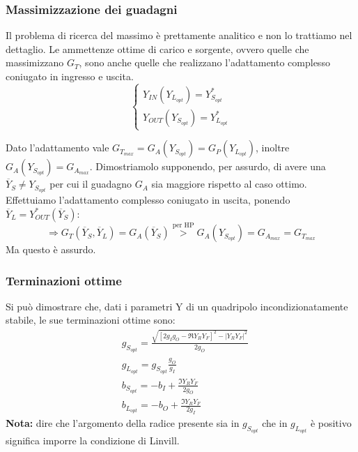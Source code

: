 \subsubsection{Massimizzazione dei guadagni}
Il problema di ricerca del massimo è prettamente analitico e non lo trattiamo nel dettaglio.	Le ammettenze ottime di carico e sorgente, ovvero quelle che massimizzano $G_T$, sono anche quelle	che realizzano l'adattamento complesso coniugato in ingresso e uscita.
\[
\begin{cases}
Y_{IN} (Y_{L_{opt}}) = Y_{S_{opt}}^*\\
Y_{OUT} (Y_{S_{opt}}) = Y_{L_{opt}}^*
\end{cases}
\]

Dato l'adattamento vale $G_{T_{max}} = G_A(Y_{S_{opt}}) = G_{P}(Y_{L_{opt}})$, inoltre $G_A(Y_{S_{opt}}) = G_{A_{max}}$.
Dimostriamolo supponendo, per assurdo, di avere una $\overline{Y}_S \neq Y_{S_{opt}}$ per cui il guadagno $G_A$ sia maggiore rispetto al caso ottimo.
\\
Effettuiamo l'adattamento complesso coniugato in uscita, ponendo $\overline{Y}_L = Y_{OUT}^*(\overline{Y}_S)$:
\[\Rightarrow G_T(\overline{Y}_S, \overline{Y}_L)=
G_A(\overline{Y}_S) \overset{\mbox{per HP}}{>}
G_A(Y_{S_{opt}}) = G_{A_{max}} = G_{T_{max}}\]
Ma questo è assurdo.

\subsubsection{Terminazioni ottime}
Si può dimostrare che, dati i parametri Y di un quadripolo incondizionatamente stabile, le sue terminazioni ottime sono:
\begin{align*}
&g_{S_{opt}} = \frac{\sqrt{\left[
2g_Ig_O - \Re{Y_RY_F} \right]^2
-|Y_R Y_F|^2}}
{2g_O}\\
&g_{L_{opt}} = g_{S_{opt}} \frac{g_O}{g_I}\\
&b_{S_{opt}} = -b_I + \frac{\Im{Y_RY_F}}{2g_O}\\
&b_{L_{opt}} = -b_O + \frac{\Im{Y_RY_F}}{2g_I}
\end{align*}
\textbf{Nota:} dire che l'argomento della radice presente sia in $g_{S_{opt}}$ che in $g_{L_{opt}}$ è positivo significa imporre la condizione di Linvill.

